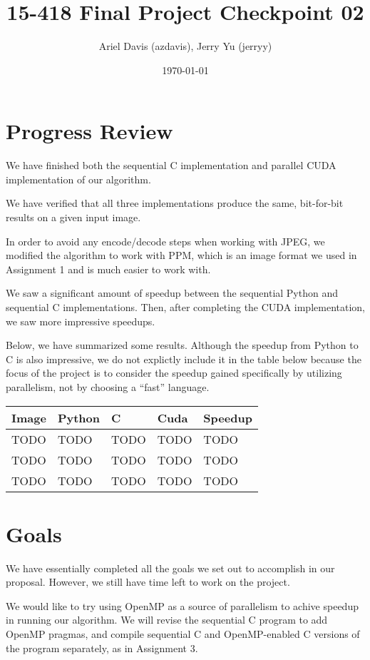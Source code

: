 \documentclass[12pt]{article}
\author{Ariel Davis (azdavis), Jerry Yu (jerryy)}
\date{\today}
\title{15-418 Final Project Checkpoint 02}
\begin{document}
\maketitle

\section{Progress Review}

We have finished both the sequential C implementation and parallel CUDA
implementation of our algorithm.

We have verified that all three implementations produce the same, bit-for-bit
results on a given input image.

In order to avoid any encode/decode steps when working with JPEG, we modified
the algorithm to work with PPM, which is an image format we used in Assignment
1 and is much easier to work with.

We saw a significant amount of speedup between the sequential Python and
sequential C implementations. Then, after completing the CUDA implementation,
we saw more impressive speedups.

Below, we have summarized some results. Although the speedup from Python to C
is also impressive, we do not explictly include it in the table below because
the focus of the project is to consider the speedup gained specifically by
utilizing parallelism, not by choosing a ``fast'' language.

\begin{tabular}{l|l|l|l|l}
    Image & Python & C & Cuda & Speedup \\
    \hline
    TODO & TODO & TODO & TODO & TODO \\
    TODO & TODO & TODO & TODO & TODO \\
    TODO & TODO & TODO & TODO & TODO
\end{tabular}

\section{Goals}

We have essentially completed all the goals we set out to accomplish in our
proposal. However, we still have time left to work on the project.

We would like to try using OpenMP as a source of parallelism to achive speedup
in running our algorithm. We will revise the sequential C program to add OpenMP
pragmas, and compile sequential C and OpenMP-enabled C versions of the program
separately, as in Assignment 3.
\end{document}
